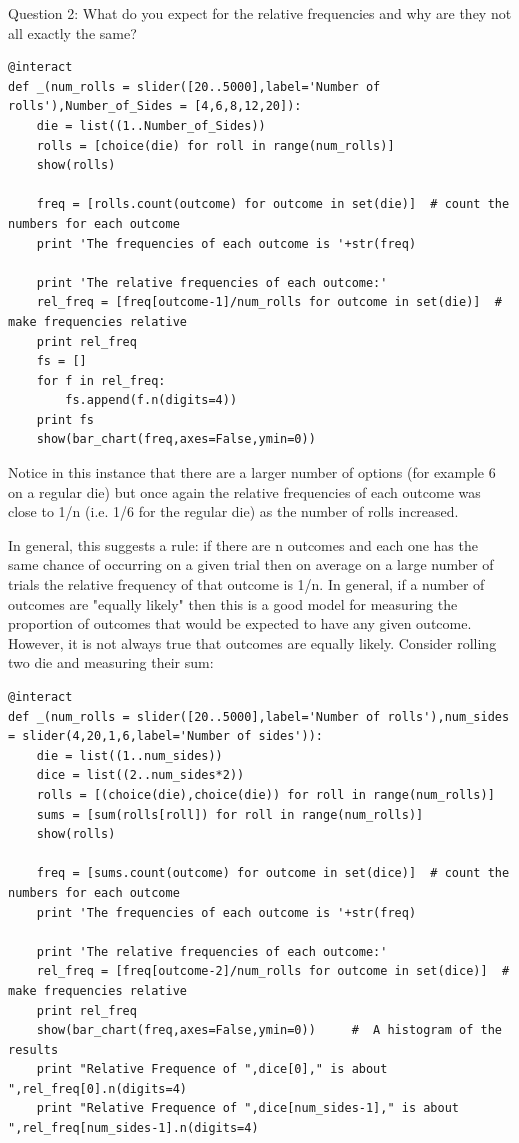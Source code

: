 \documentclass[10pt,]{book}
\theoremstyle{plain}
\theoremstyle{definition}
\theoremstyle{definition}
\numberwithin{equation}{section}
\begin{document}
	Question 2: What do you expect for the relative frequencies and why are they not all exactly the same?
\begin{lstlisting}[style=sageinput]
@interact
def _(num_rolls = slider([20..5000],label='Number of rolls'),Number_of_Sides = [4,6,8,12,20]):
	die = list((1..Number_of_Sides))
	rolls = [choice(die) for roll in range(num_rolls)]
	show(rolls)   

	freq = [rolls.count(outcome) for outcome in set(die)]  # count the numbers for each outcome
	print 'The frequencies of each outcome is '+str(freq)

	print 'The relative frequencies of each outcome:'
	rel_freq = [freq[outcome-1]/num_rolls for outcome in set(die)]  # make frequencies relative
	print rel_freq
	fs = []
	for f in rel_freq:
		fs.append(f.n(digits=4))
	print fs
	show(bar_chart(freq,axes=False,ymin=0))
\end{lstlisting}
\par
Notice in this instance that there are a larger number of options (for example 6 on a regular
	die) but once again the relative frequencies of each  outcome was close to 1/n (i.e. 1/6 for the regular die)
	as the number of rolls increased.%
\par
In general, this suggests a rule: if there are n outcomes and each one has the same
	chance of occurring on a given trial then on average on a large number of trials the relative
	frequency of that outcome is 1/n.
	In general, if a number of outcomes are "equally likely" then this is a good model for measuring
	the proportion of outcomes that would be expected to have any given outcome. However, it is not
	always true that outcomes are equally likely. Consider rolling two die and measuring their sum:%
\begin{lstlisting}[style=sageinput]
@interact
def _(num_rolls = slider([20..5000],label='Number of rolls'),num_sides = slider(4,20,1,6,label='Number of sides')):
    die = list((1..num_sides))
    dice = list((2..num_sides*2))
    rolls = [(choice(die),choice(die)) for roll in range(num_rolls)]
    sums = [sum(rolls[roll]) for roll in range(num_rolls)]
    show(rolls)   

    freq = [sums.count(outcome) for outcome in set(dice)]  # count the numbers for each outcome
    print 'The frequencies of each outcome is '+str(freq)
    
    print 'The relative frequencies of each outcome:'
    rel_freq = [freq[outcome-2]/num_rolls for outcome in set(dice)]  # make frequencies relative
    print rel_freq        
    show(bar_chart(freq,axes=False,ymin=0))     #  A histogram of the results
    print "Relative Frequence of ",dice[0]," is about ",rel_freq[0].n(digits=4)
    print "Relative Frequence of ",dice[num_sides-1]," is about ",rel_freq[num_sides-1].n(digits=4)
\end{lstlisting}
\end{document}
